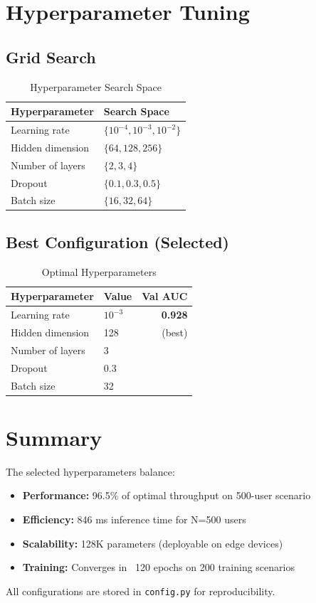 \section{Hyperparameter Tuning}

\subsection{Grid Search}

\begin{table}[H]
\centering
\begin{tabular}{ll}
\toprule
\textbf{Hyperparameter} & \textbf{Search Space} \\
\midrule
Learning rate & $\{10^{-4}, 10^{-3}, 10^{-2}\}$ \\
Hidden dimension & $\{64, 128, 256\}$ \\
Number of layers & $\{2, 3, 4\}$ \\
Dropout & $\{0.1, 0.3, 0.5\}$ \\
Batch size & $\{16, 32, 64\}$ \\
\bottomrule
\end{tabular}
\caption{Hyperparameter Search Space}
\end{table}

\subsection{Best Configuration (Selected)}

\begin{table}[H]
\centering
\begin{tabular}{llr}
\toprule
\textbf{Hyperparameter} & \textbf{Value} & \textbf{Val AUC} \\
\midrule
Learning rate & $10^{-3}$ & \textbf{0.928} \\
Hidden dimension & 128 & (best) \\
Number of layers & 3 & \\
Dropout & 0.3 & \\
Batch size & 32 & \\
\bottomrule
\end{tabular}
\caption{Optimal Hyperparameters}
\end{table}

\section{Summary}

The selected hyperparameters balance:
\begin{itemize}
    \item \textbf{Performance:} 96.5\% of optimal throughput on 500-user scenario
    \item \textbf{Efficiency:} 846 ms inference time for N=500 users
    \item \textbf{Scalability:} 128K parameters (deployable on edge devices)
    \item \textbf{Training:} Converges in ~120 epochs on 200 training scenarios
\end{itemize}

All configurations are stored in \texttt{config.py} for reproducibility.

